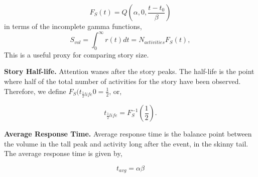 \documentclass{article}
\begin{document}
\begin{equation}
F_S(t) = Q(\alpha, 0, \frac{ t-t_0}{\beta})
\label{incgamma}
\end{equation}
in terms of the incomplete gamma functions, 
\begin{equation}
S_{vol} = \int_0^\infty r(t) dt = N_{activities} F_S(t),
\label{eq:mass}
\end{equation}
This is a useful proxy for comparing story size.

\textbf{Story Half-life.}  Attention wanes after the story peaks. The half-life is the point where half of the total number of activities for the story have been observed. Therefore, we define $F_S(t_{\frac{1}{2}life}0 = \frac{1}{2}$, or, 

\begin{equation}
t_{\frac{1}{2}life} = F^{-1}_S(\frac{1}{2}).
\label{eq:half}
\end{equation} 

\textbf{Average Response Time.}  Average response time is the balance point between the volume in the tall peak and activity long after the event, in the skinny tail. The average response time is given by,

 \begin{equation}
t_{avg} = \alpha \beta
\label{eq:avg}
\end{equation}
\end{document}

